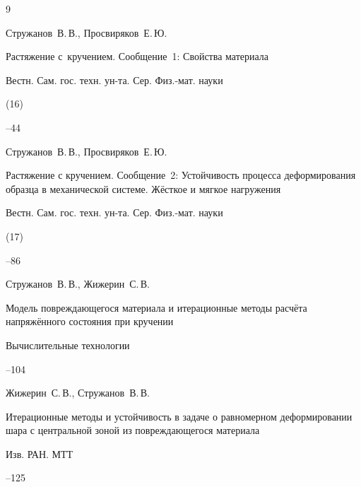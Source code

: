 


\begin{thebibliography}{9}


\by Стружанов~В.\,В., Просвиряков~Е.\,Ю.

\paper Растяжение с~кручением. Сообщение~1: Свойства материала

\jour Вестн. Сам. гос. техн. ун-та. Сер. Физ.-мат. науки


(16)

--44




\by Стружанов~В.\,В., Просвиряков~Е.\,Ю.

\paper Растяжение с кручением. Сообщение~2: Устойчивость процесса деформирования образца в механической системе. Жёсткое и мягкое нагружения

\jour  Вестн. Сам. гос. техн. ун-та. Сер. Физ.-мат. науки


(17)

--86




\by Стружанов~В.\,В., Жижерин~С.\,В.

\paper Модель повреждающегося материала и итерационные методы расчёта напряжённого состояния при кручении

\jour Вычислительные технологии




--104




\by Жижерин~С.\,В., Стружанов~В.\,В.

\paper Итерационные методы и устойчивость в задаче о равномерном деформировании шара с центральной зоной из повреждающегося материала

\jour Изв. РАН. МТТ



--125





\end{thebibliography}
